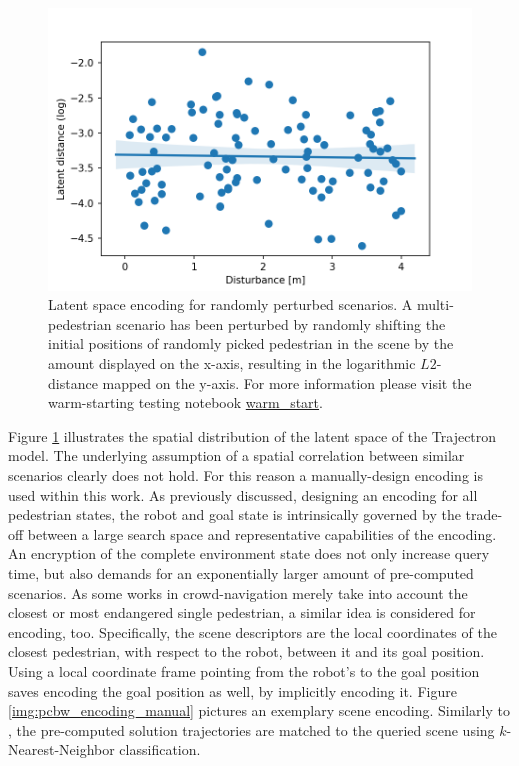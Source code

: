 \begin{figure}[!ht]
\begin{center}
\includegraphics[width=\imgwidth]{images/enc_latent_reg.png}
\caption{Latent space encoding for randomly perturbed scenarios. A multi-pedestrian scenario has been perturbed by randomly shifting the initial positions of randomly picked pedestrian in the scene by the amount displayed on the x-axis, resulting in the logarithmic $L2$-distance mapped on the y-axis. For more information please visit the warm-starting testing notebook \href{https://github.com/simon-schaefer/mantrap/blob/master/examples/warm_start.ipynb}{warm\_start}.}
\label{img:pcbw_encoding_latent}
\end{center}
\end{figure}

Figure \ref{img:pcbw_encoding_latent} illustrates the spatial distribution of the latent space of the Trajectron model. The underlying assumption of a spatial correlation between similar scenarios clearly does not hold. For this reason a manually-design encoding is used within this work. As previously discussed, designing an encoding for all pedestrian states, the robot and goal state is intrinsically governed by the trade-off between a large search space and representative capabilities of the encoding. An encryption of the complete environment state does not only increase query time, but also demands for an exponentially larger amount of pre-computed scenarios. As some works in crowd-navigation merely take into account the closest or most endangered single pedestrian, a similar idea is considered for encoding, too. Specifically, the scene descriptors are the local coordinates of the closest pedestrian, with respect to the robot, between it and its goal position. Using a local coordinate frame pointing from the robot's to the goal position saves encoding the goal position as well, by implicitly encoding it. Figure \ref{img:pcbw_encoding_manual} pictures an exemplary scene encoding. Similarly to \cite{Merkt2018}, the pre-computed solution trajectories are matched to the queried scene using $k$-Nearest-Neighbor classification. 

